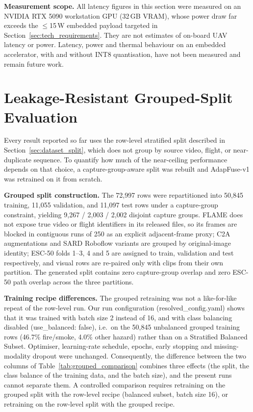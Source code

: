 \textbf{Measurement scope.} All latency figures in this section were measured on an NVIDIA RTX 5090 workstation GPU (32\,GB VRAM), whose power draw far exceeds the $\leq$15\,W embedded payload targeted in Section~\ref{sec:tech_requirements}. They are not estimates of on-board UAV latency or power. Latency, power and thermal behaviour on an embedded accelerator, with and without INT8 quantisation, have not been measured and remain future work.

\section{Leakage-Resistant Grouped-Split Evaluation}
\label{sec:grouped_split}

Every result reported so far uses the row-level stratified split described in Section~\ref{sec:dataset_split}, which does not group by source video, flight, or near-duplicate sequence. To quantify how much of the near-ceiling performance depends on that choice, a capture-group-aware split was rebuilt and AdapFuse-v1 was retrained on it from scratch.

\textbf{Grouped split construction.} The 72{,}997 rows were repartitioned into 50{,}845 training, 11{,}055 validation, and 11{,}097 test rows under a capture-group constraint, yielding 9{,}267 / 2{,}003 / 2{,}002 disjoint capture groups. FLAME does not expose true video or flight identifiers in its released files, so its frames are blocked in contiguous runs of 250 as an explicit adjacent-frame proxy; C2A augmentations and SARD Roboflow variants are grouped by original-image identity; ESC-50 folds 1--3, 4 and 5 are assigned to train, validation and test respectively, and visual rows are re-paired only with clips from their own partition. The generated split contains zero capture-group overlap and zero ESC-50 path overlap across the three partitions.

\textbf{Training recipe differences.} The grouped retraining was not a like-for-like repeat of the row-level run. Our run configuration (resolved\_config.yaml) shows that it was trained with batch size 2 instead of 16, and with class balancing disabled (use\_balanced: false), i.e.\ on the 50{,}845 unbalanced grouped training rows (46.7\% fire/smoke, 4.0\% other hazard) rather than on a Stratified Balanced Subset. Optimiser, learning-rate schedule, epochs, early stopping and missing-modality dropout were unchanged. Consequently, the difference between the two columns of Table~\ref{tab:grouped_comparison} combines three effects (the split, the class balance of the training data, and the batch size), and the present runs cannot separate them. A controlled comparison requires retraining on the grouped split with the row-level recipe (balanced subset, batch size 16), or retraining on the row-level split with the grouped recipe.

